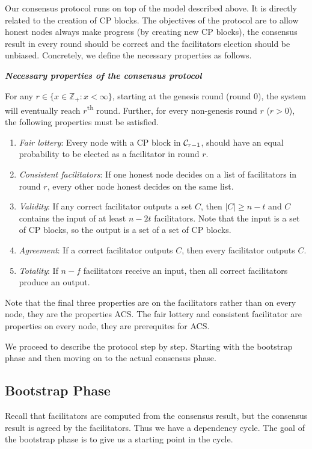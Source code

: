 Our consensus protocol runs on top of the model described above.
It is directly related to the creation of CP blocks.
The objectives of the protocol are to allow honest nodes always make progress (by creating new CP blocks),
the consensus result in every round should be correct and the facilitators election should be unbiased.
Concretely, we define the necessary properties as follows.
\begin{definition}
\label{def:consensus}
\textbf{\emph{Necessary properties of the consensus protocol}}

For any $r \in \{ x \in \mathbb{Z}_+ : x < \infty \}$, starting at the genesis round (round 0),
the system will eventually reach $r$\textsuperscript{th} round.
Further, for every non-genesis round $r$ ($r > 0$), the following properties must be satisfied.
\begin{enumerate}
    \item \emph{Fair lottery}:
        Every node with a CP block in $\mathcal{C}_{r - 1}$,
        should have an equal probability to be elected as a facilitator in round $r$.
    \item \emph{Consistent facilitators}:
        If one honest node decides on a list of facilitators in round $r$,
        every other node honest decides on the same list.
    \item \emph{Validity}:
        If any correct facilitator outputs a set $C$, then $|C| \ge n - t$ and $C$ contains the input of at least $n - 2t$ facilitators.
        Note that the input is a set of CP blocks, so the output is a set of a set of CP blocks.
    \item \emph{Agreement}:
        If a correct facilitator outputs $C$, then every facilitator outputs $C$.
    \item \emph{Totality}:
        If $n - f$ facilitators receive an input, then all correct facilitators produce an output.
\end{enumerate}
\end{definition}
Note that the final three properties are on the facilitators rather than on every node,
they are the properties ACS. 
The fair lottery and consistent facilitator are properties on every node,
they are prerequites for ACS.

We proceed to describe the protocol step by step.
Starting with the bootstrap phase and then moving on to the actual consensus phase.

\subsection{Bootstrap Phase}
\label{sec:bootstrap}
Recall that facilitators are computed from the consensus result,
but the consensus result is agreed by the facilitators.
Thus we have a dependency cycle.
The goal of the bootstrap phase is to give us a starting point in the cycle.

